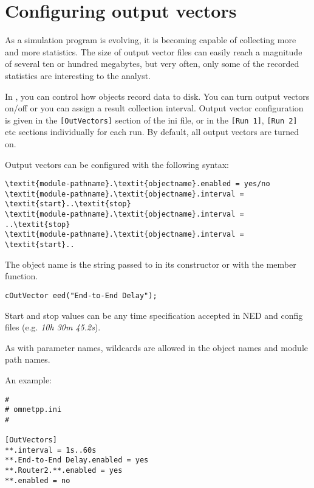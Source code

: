 \section{Configuring output vectors}
\label{sec:ch-run-sim:outvectors}

As a simulation program is evolving, it is becoming capable of
collecting more and more statistics. The size of output vector
files can easily reach a magnitude of
several ten or hundred megabytes, but very often, only some of the
recorded statistics are interesting to the analyst.

In {\opp}, you can control how  objects record data
to disk. You can turn output vectors on/off or you can assign a result
collection interval. Output vector configuration is given in the
\texttt{[OutVectors]} section of the ini file, or in the \texttt{[Run
  1]}, \texttt{[Run 2]} etc sections individually for each run. By
default, all output vectors are turned on.

Output vectors can be configured with the following syntax:

\begin{Verbatim}[commandchars=\\\{\}]
\textit{module-pathname}.\textit{objectname}.enabled = yes/no
\textit{module-pathname}.\textit{objectname}.interval = \textit{start}..\textit{stop}
\textit{module-pathname}.\textit{objectname}.interval = ..\textit{stop}
\textit{module-pathname}.\textit{objectname}.interval = \textit{start}..
\end{Verbatim}

The object name is the string passed to  in its constructor
or with the  member function.

\begin{verbatim}
cOutVector eed("End-to-End Delay");
\end{verbatim}

Start and stop values can be any time specification accepted
in NED and config files (e.g. \textit{10h 30m 45.2s}).

As with parameter names, wildcards are allowed in the object
names and module path names.

An example:

\begin{verbatim}
#
# omnetpp.ini
#

[OutVectors]
**.interval = 1s..60s
**.End-to-End Delay.enabled = yes
**.Router2.**.enabled = yes
**.enabled = no
\end{verbatim}



